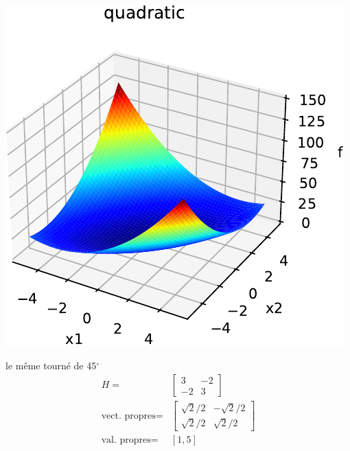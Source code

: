 \documentclass[12pt]{beamer}
\begin{document}
\begin{frame}[allowframebreaks]
\begin{minipage}{0.5\textwidth}
\includegraphics[width=\textwidth]{quad_rot45_cond5_H_3_m2_m2_3-crop.pdf}
\end{minipage}
\begin{minipage}{0.4\textwidth}
le même tourné de 45$^\circ$
\begin{align*}
H =& \begin{bmatrix} 3 & -2 \\ -2 & 3\end{bmatrix}  \\
\text{vect. propres} =& \begin{bmatrix} \sqrt{2}/2 & -\sqrt{2}/2 \\  \sqrt{2}/2 & \sqrt{2}/2 \end{bmatrix}\\
\text{val. propres} = & [1, 5]
\end{align*}
\end{minipage}
\newpage
\begin{minipage}{0.5\textwidth}

\end{minipage}
\end{frame}
\end{document}
